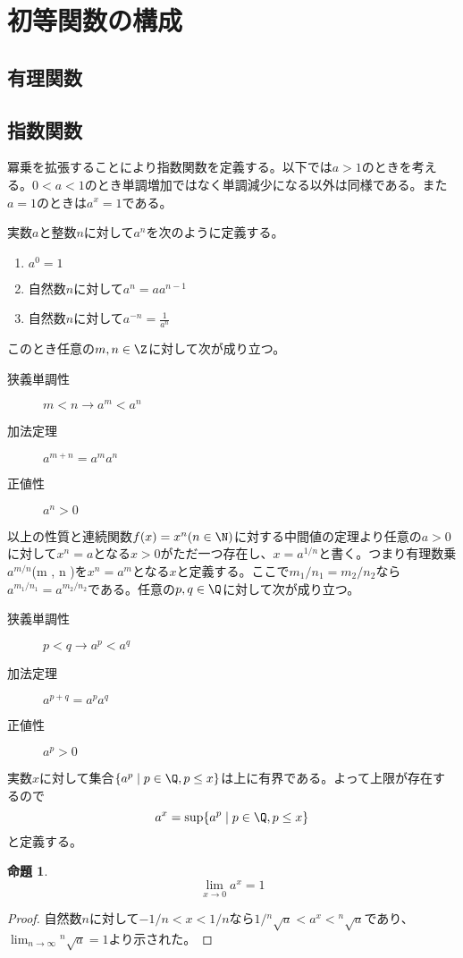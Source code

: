 \section{初等関数の構成}

\subsection{有理関数}
\subsection{指数関数}
冪乗を拡張することにより指数関数を定義する。以下では$a > 1$のときを考える。$0 < a < 1$のとき単調増加ではなく単調減少になる以外は同様である。また$a = 1$のときは$a^x = 1$である。

実数$a$と整数$n$に対して$a^n$を次のように定義する。
\begin{enumerate}
	\item $a^0 = 1$
	\item 自然数$n$に対して$a^n = aa^{n-1}$
	\item 自然数$n$に対して$a^{-n} = \frac{1}{a^n}$
\end{enumerate}
このとき任意の$m, n \in \Z$に対して次が成り立つ。
\begin{description}
	\item[狭義単調性] $m < n \rightarrow a^m < a^n$
	\item[加法定理] $a^{m + n} = a^ma^n$
	\item[正値性] $a^n > 0$
\end{description}
以上の性質と連続関数$f(x) = x^n(n \in \N)$に対する中間値の定理より任意の$a > 0$に対して$x^n = a$となる$x > 0$がただ一つ存在し、$x = a^{1/n}$と書く。つまり有理数乗$a^{m/n}$(m \in \Z, n \in \N)を$x^n = a^m$となる$x$と定義する。ここで$m_1/n_1 = m_2/n_2$なら$a^{m_1/n_1} = a^{m_2/n_2}$である。任意の$p, q \in \Q$に対して次が成り立つ。
\begin{description}
	\item[狭義単調性] $p < q \rightarrow a^p < a^q$
	\item[加法定理] $a^{p + q} = a^pa^q$
	\item[正値性] $a^p > 0$
\end{description}
実数$x$に対して集合$\{a^p \mid p \in \Q, p \leq x\}$は上に有界である。よって上限が存在するので
	\[a^x = \sup\{a^p \mid p \in \Q, p \leq x\}\]
と定義する。

\newtheorem{prop}{命題}
\begin{prop}
	\[\lim_{x \to 0} a^x = 1\]
\end{prop}
\begin{proof}
	自然数$n$に対して$-1/n < x < 1/n$なら$1/{}^n\sqrt{a} < a^x < {}^n\sqrt{a}$であり、$\lim_{n \to \infty} {}^n\sqrt{a} = 1$より示された。
\end{proof}

